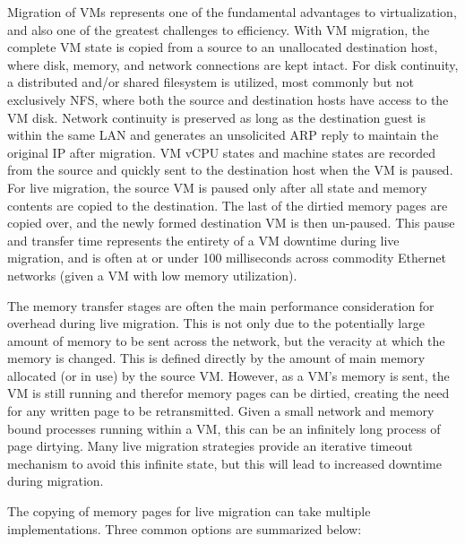 Migration of VMs represents one of the fundamental advantages to virtualization, and also one of the greatest challenges to efficiency.  With VM migration, the complete VM state is copied from a source to an unallocated destination host, where disk, memory, and network connections are kept intact. For disk continuity, a distributed and/or shared filesystem is utilized, most commonly but not exclusively NFS, where both the source and destination hosts have access to the VM disk.  Network continuity is preserved as long as the destination guest is within the same LAN and generates an unsolicited ARP reply to maintain the original IP after migration.  VM vCPU states and machine states are recorded from the source and quickly sent to the destination host when the VM is paused. For live migration, the source VM is paused only after all state and memory contents are copied to the destination. The last of the dirtied memory pages are copied over, and the newly formed destination VM is then un-paused.  This pause and transfer time represents the entirety of a VM downtime during live migration, and is often at or under 100 milliseconds across commodity Ethernet networks (given a VM with low memory utilization).  

The memory transfer stages are often the main performance consideration for overhead during live migration. This is not only due to the potentially large amount of memory to be sent across the network, but the veracity at which the memory is changed.  This is defined directly by the amount of main memory allocated (or in use) by the source VM. However, as a VM's memory is sent, the VM is still running and therefor memory pages can be dirtied, creating the need for any written page to be retransmitted. Given a small network and memory bound processes running within a VM, this can be an infinitely long process of page dirtying. Many live migration strategies provide an iterative timeout mechanism to avoid this infinite state, but this will lead to increased downtime during migration.  

The copying of memory pages for live migration can take multiple implementations. Three common options are summarized below:

